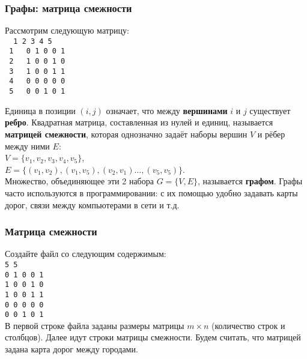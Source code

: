 \begin{frame}
	\frametitle{Графы: матрица смежности}
	Рассмотрим следующую матрицу: \\
	{\tt %
	{\color{gray} \hspace{-4pt} 1 2 3 4 5} \\%
	{\color{gray} 1 \,} 0 1 0 0 1 \\%
	{\color{gray} 2 \,} 1 0 0 1 0 \\%
	{\color{gray} 3 \,} 1 0 0 1 1 \\%
	{\color{gray} 4 \,} 0 0 0 0 0 \\%
	{\color{gray} 5 \,} 0 0 1 0 1 \\}

	Единица в позиции $(i,j)$ означает, что между {\bf вершинами} $i$ и $j$
	существует {\bf ребро}. Квадратная матрица, составленная из нулей и единиц,
	называется {\bf матрицей смежности}, которая однозначно задаёт наборы вершин
	$V$ и рёбер между ними $E$: \\
	$V = \{v_1, v_2, v_3, v_4, v_5\}$, \\
	$E = \{(v_1, v_2), (v_1, v_5), (v_2, v_1) \dots, (v_5, v_5)\}$.\\

	Множество, объединяющее эти 2 набора $G = \{V, E\}$, называется {\bf графом}.
	Графы часто используются в программировании: с их помощью удобно задавать
	карты дорог, связи между компьютерами в сети и т.д.

\end{frame}

\begin{frame}
	\frametitle{Матрица смежности}
	Создайте файл  со следующим содержимым: \\
	{\tt 5 5 \\ 0 1 0 0 1 \\ 1 0 0 1 0 \\ 1 0 0 1 1 \\ 0 0 0 0 0 \\ 0 0 1 0 1 \\}
	В первой строке файла заданы размеры матрицы $m \times n$ (количество строк и
	столбцов). Далее идут строки матрицы смежности. Будем считать, что матрицей
	задана карта дорог между городами. \\

\end{frame}


